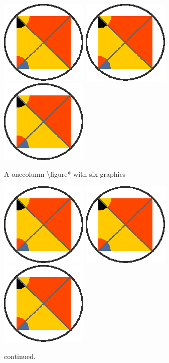 \documentclass{aa}
\begin{document}
   \begin{figure}
        \centering
        \includegraphics{figure.eps}
        \includegraphics[angle=90]{figure.eps}
        \includegraphics{figure.eps}
        {\caption{A onecolumn \textbackslash figure* with six graphics}}
        \ContinuedFloat %
        \includegraphics[angle=90]{figure.eps}
        \includegraphics{figure.eps}
        \includegraphics[angle=90]{figure.eps}
        \caption{continued.}
        \label{FigGam}%
    \end{figure}
\end{document}
